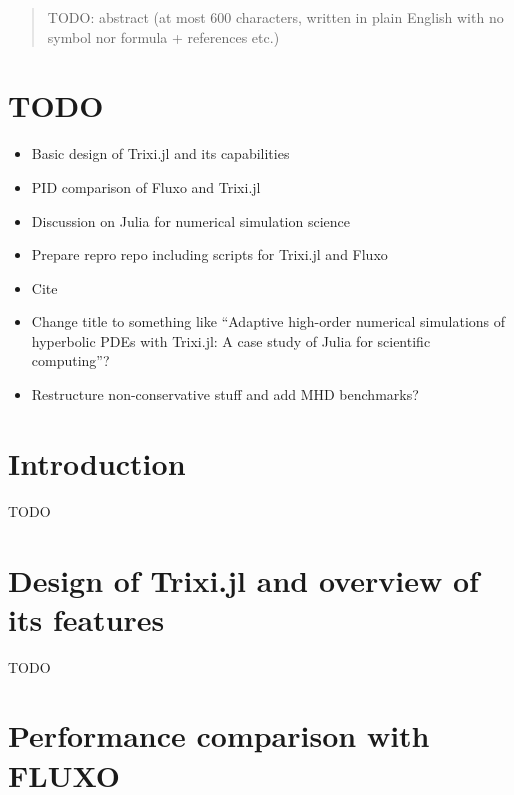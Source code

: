 \documentclass{juliacon}
\begin{document}


\maketitle

\begin{abstract}
TODO: abstract (at most 600 characters, written in plain English with no symbol
nor formula + references etc.) %
\end{abstract}


\section*{TODO}

\begin{itemize}
  \item Basic design of Trixi.jl and its capabilities
  \item PID comparison of Fluxo and Trixi.jl
  \item Discussion on Julia for numerical simulation science
  \item Prepare repro repo including scripts for Trixi.jl and Fluxo
  \item Cite \cite{bezanson2017julia,schlottkelakemper2021purely,rackauckas2017differentialequations,revels2016forward,ranocha2021sbp}
  \item Change title to something like ``Adaptive high-order numerical simulations
  of hyperbolic PDEs with Trixi.jl: A case study of Julia for scientific computing''?
  \item Restructure non-conservative stuff and add MHD benchmarks?
\end{itemize}


\section{Introduction}

TODO %


\section{Design of Trixi.jl and overview of its features}

TODO %


\section{Performance comparison with FLUXO}
\end{document}

